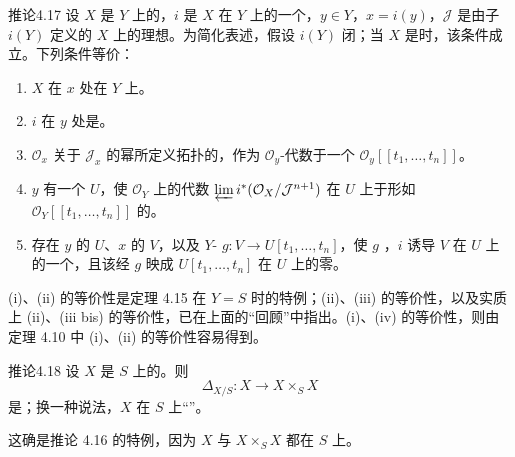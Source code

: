 \begin{SGAresult}{推论}{4.17}
设 $X$ 是 $Y$ 上的，$i$ 是 $X$ 在 $Y$ 上的一个，$y\in Y$，$x=i(y)$，$\mathcal J$ 是由子 $i(Y)$ 定义的 $X$ 上的理想。为简化表述，假设 $i(Y)$ 闭；当 $X$ 是时，该条件成立。下列条件等价：
\begin{enumerate}
\item[(i)] $X$ 在 $x$ 处在 $Y$ 上。
\item[(ii)] $i$ 在 $y$ 处是。
\item[(iii)] $\mathcal O_x$ 关于 $\mathcal J_x$ 的幂所定义拓扑的，作为 $\mathcal O_y$-代数于一个 $\mathcal O_y[[t_1,\ldots,t_n]]$。
\item[(iii bis)] $y$ 有一个 $U$，使 $\mathcal O_Y$ 上的代数 $\varprojlim i^*(\mathcal O_X/\mathcal J^{n+1})$ 在 $U$ 上于形如 $\mathcal O_Y[[t_1,\ldots,t_n]]$ 的。
\item[(iv)] 存在 $y$ 的 $U$、$x$ 的 $V$，以及 $Y$- $g:V\to U[t_1,\ldots,t_n]$，使 $g$ ，$i$ 诱导 $V$ 在 $U$ 上的一个，且该经 $g$ 映成 $U[t_1,\ldots,t_n]$ 在 $U$ 上的零。
\end{enumerate}
\end{SGAresult}
(i)、(ii) 的等价性是定理 4.15 在 $Y=S$ 时的特例；(ii)、(iii) 的等价性，以及实质上 (ii)、(iii bis) 的等价性，已在上面的“回顾”中指出。(i)、(iv) 的等价性，则由定理 4.10 中 (i)、(ii) 的等价性容易得到。

\begin{SGAresult}{推论}{4.18}
设 $X$ 是 $S$ 上的。则
\[
\Delta_{X/S}:X\longrightarrow X\times_S X
\]
是；换一种说法，$X$ 在 $S$ 上“”。
\end{SGAresult}
这确是推论 4.16 的特例，因为 $X$ 与 $X\times_S X$ 都在 $S$ 上。

